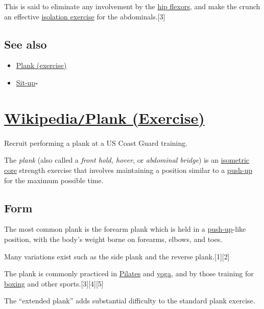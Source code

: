 \documentclass[oneside]{book}
\numberwithin{equation}{section}
\begin{document}
This is said to eliminate any involvement by the \href{https://en.wikipedia.org/wiki/Hip_flexors}{hip flexors}, and make the crunch an effective \href{https://en.wikipedia.org/wiki/Isolation_exercise}{isolation exercise} for the abdominals.[3]

\subsection{See also}
\begin{itemize}
    \item \href{https://en.wikipedia.org/wiki/Plank_(exercise)}{Plank (exercise)}
    \item \href{https://en.wikipedia.org/wiki/Sit-up}{Sit-up}\hfill$\square$
\end{itemize}


\section{\href{https://en.wikipedia.org/wiki/Plank_(exercise)}{Wikipedia\texttt{/}Plank (Exercise)}}
\textsf{Recruit performing a plank at a US Coast Guard training.}

The \textit{plank} (also called a \textit{front hold, hover}, or \textit{abdominal bridge}) is an \href{https://en.wikipedia.org/wiki/Isometric_exercise}{isometric} \href{https://en.wikipedia.org/wiki/Core_(anatomy)}{core} strength exercise that involves maintaining a position similar to a \href{https://en.wikipedia.org/wiki/Push-up}{push-up} for the maximum possible time.

\subsection{Form}
The most common plank is the forearm plank which is held in a \href{https://en.wikipedia.org/wiki/Push-up}{push-up}-like position, with the body's weight borne on forearms, elbows, and toes.

Many variations exist such as the side plank and the reverse plank.[1][2]

The plank is commonly practiced in \href{https://en.wikipedia.org/wiki/Pilates}{Pilates} and \href{https://en.wikipedia.org/wiki/Yoga}{yoga}, and by those training for \href{https://en.wikipedia.org/wiki/Boxing}{boxing} and other sports.[3][4][5]

%
The ``extended plank'' adds substantial difficulty to the standard plank exercise.
\end{document}
